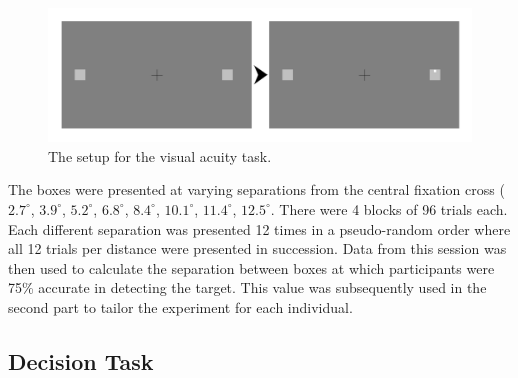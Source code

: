 \documentclass[vision,article,submit,moreauthors,pdftex,10pt,a4paper]{mdpi}
\begin{document}
\begin{figure}[H]
	\centering
	\includegraphics[scale=.6]{../Figures/Part_1_timeline.png}
	\caption{The setup for the visual acuity task.}
	\label{fig:Part1}
\end{figure} 

The boxes were presented at varying separations from the central fixation cross ($2.7^{\circ}$, $3.9^{\circ}$, $5.2^{\circ}$, $6.8^{\circ}$, $8.4^{\circ}$, $10.1^{\circ}$, $11.4^{\circ}$, $12.5^{\circ}$. There were 4 blocks of 96 trials each. Each different separation was presented 12 times in a pseudo-random order where all 12 trials per distance were presented in succession. Data from this session was then used to calculate the separation between boxes at which participants were 75\% accurate in detecting the target. This value was subsequently used in the second part to tailor the experiment for each individual.

\subsection{Decision Task}
\end{document}
